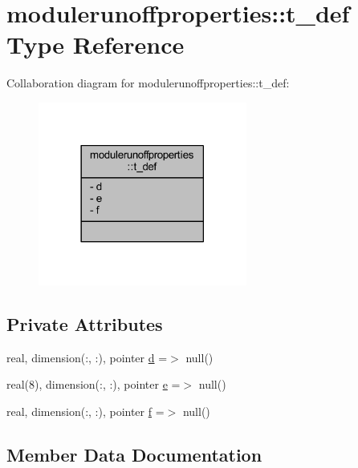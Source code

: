 \hypertarget{structmodulerunoffproperties_1_1t__def}{}\section{modulerunoffproperties\+:\+:t\+\_\+def Type Reference}
\label{structmodulerunoffproperties_1_1t__def}


Collaboration diagram for modulerunoffproperties\+:\+:t\+\_\+def\+:\nopagebreak
\begin{figure}[H]
\begin{center}
\leavevmode
\includegraphics[width=194pt]{structmodulerunoffproperties_1_1t__def__coll__graph}
\end{center}
\end{figure}
\subsection*{Private Attributes}
\begin{DoxyCompactItemize}
\item 
real, dimension(\+:, \+:), pointer \mbox{\hyperlink{structmodulerunoffproperties_1_1t__def_a3b3c1c65b030cbcc6a9d3edfe1cb51b7}{d}} =$>$ null()
\item 
real(8), dimension(\+:, \+:), pointer \mbox{\hyperlink{structmodulerunoffproperties_1_1t__def_a88e594de466ff3bae61465bdbab180b4}{e}} =$>$ null()
\item 
real, dimension(\+:, \+:), pointer \mbox{\hyperlink{structmodulerunoffproperties_1_1t__def_a922ef5d5498fbc1b2e5a8aa4c9f9472d}{f}} =$>$ null()
\end{DoxyCompactItemize}


\subsection{Member Data Documentation}
\mbox{\label{structmodulerunoffproperties_1_1t__def_a3b3c1c65b030cbcc6a9d3edfe1cb51b7}} 
